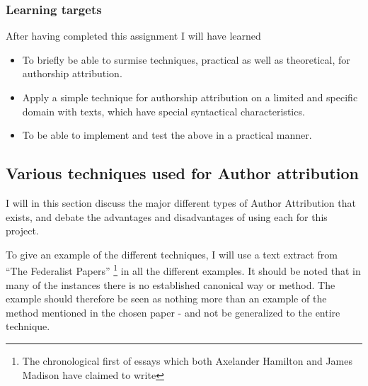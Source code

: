 \subsubsection{Learning targets}
After having completed this assignment I will have learned 
\begin{itemize}
\item To briefly be able to surmise techniques, practical as well as theoretical, for authorship attribution.
\item Apply a simple technique for authorship attribution on a limited and specific domain with texts, which have special syntactical characteristics.
\item To be able to implement and test the above in a practical manner.
\end{itemize}

\subsection{Various techniques used for Author attribution}

I will in this section discuss the major different types of Author Attribution that exists, and debate the advantages and disadvantages of using each for this project.

To give an example of the different techniques, I will use a text extract from ``The Federalist Papers'' \cite{federalist} \footnote{The chronological first of essays which both Axelander Hamilton and James Madison have claimed to write} in all the different examples. It should be noted that in many of the instances there is no established canonical way or method. The example should therefore be seen as nothing more than an example of the method mentioned in the chosen paper - and not be generalized to the entire technique.


